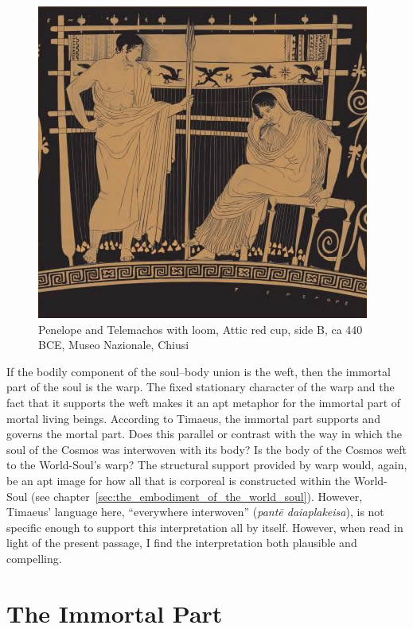 \begin{figure}[htbp]
     \centering
         \includegraphics[scale=0.80]{graphics/penelope_chiusi.jpg}
     \caption{Penelope and Telemachos with loom, Attic red cup, side B, ca 440 BCE, Museo Nazionale, Chiusi}
     \label{fig:loom}
\end{figure}

If the bodily component of the soul--body union is the weft, then the immortal part of the soul is the warp. The fixed stationary character of the warp and the fact that it supports the weft makes it an apt metaphor for the immortal part of mortal living beings. According to Timaeus, the immortal part supports and governs the mortal part. Does this parallel or contrast with the way in which the soul of the Cosmos was interwoven with its body? Is the body of the Cosmos weft to the World-Soul's warp? The structural support provided by warp would, again, be an apt image for how all that is corporeal is constructed within the World-Soul (see chapter~\ref{sec:the_embodiment_of_the_world_soul}). However, Timaeus' language here, ``everywhere interwoven'' (\emph{pantē daiaplakeisa}), is not specific enough to support this interpretation all by itself. However, when read in light of the present passage, I find the interpretation both plausible and compelling.


\section{The Immortal Part} %
\label{sec:the_immortal_part}

